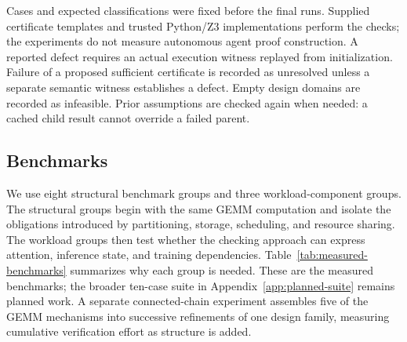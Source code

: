 \documentclass[11pt]{article}
\begin{document}
Cases and expected classifications were fixed before the final runs. Supplied certificate templates and trusted Python/Z3 implementations perform the checks; the experiments do not measure autonomous agent proof construction. A reported defect requires an actual execution witness replayed from initialization. Failure of a proposed sufficient certificate is recorded as unresolved unless a separate semantic witness establishes a defect. Empty design domains are recorded as infeasible. Prior assumptions are checked again when needed: a cached child result cannot override a failed parent.

\subsection{Benchmarks}\label{sec:benchmarks}
We use eight structural benchmark groups and three workload-component groups. The structural groups begin with the same GEMM computation and isolate the obligations introduced by partitioning, storage, scheduling, and resource sharing. The workload groups then test whether the checking approach can express attention, inference state, and training dependencies. Table~\ref{tab:measured-benchmarks} summarizes why each group is needed. These are the measured benchmarks; the broader ten-case suite in Appendix~\ref{app:planned-suite} remains planned work. A separate connected-chain experiment assembles five of the GEMM mechanisms into successive refinements of one design family, measuring cumulative verification effort as structure is added.
\end{document}
